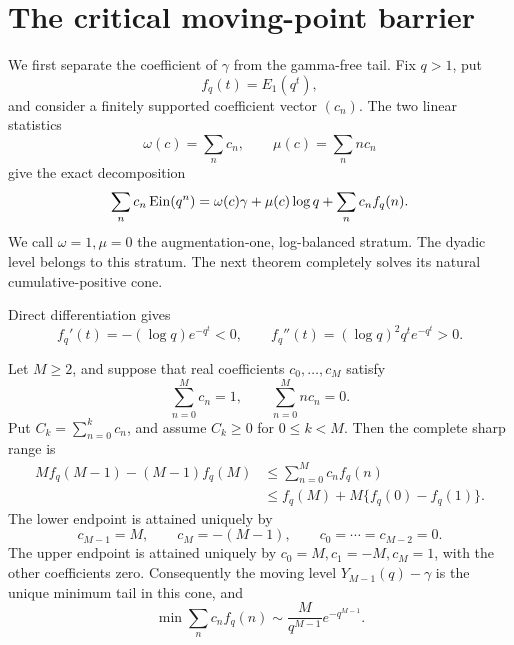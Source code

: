 \section{The critical moving-point barrier}
\label{sec:barrier}

We first separate the coefficient of \(\gamma\) from the gamma-free tail.
Fix \(q>1\), put
\[
 f_q(t)=E_1(q^t),
\]
and consider a finitely supported coefficient vector \((c_n)\).  The two
linear statistics
\[
 \omega(c)=\sum_nc_n,
 \qquad
 \mu(c)=\sum_nnc_n
\]
give the exact decomposition
\begin{equation}\label{eq:augmentation-decomposition}
 \sum_nc_n\operatorname{Ein}(q^n)
 =\omega(c)\gamma+\mu(c)\log q+\sum_nc_nf_q(n).
\end{equation}
We call \(\omega=1,\mu=0\) the augmentation-one, log-balanced stratum.
The dyadic level belongs to this stratum.  The next theorem completely solves
its natural cumulative-positive cone.

Direct differentiation gives
\begin{equation}\label{eq:fq-convex}
 f_q'(t)=-(\log q)e^{-q^t}<0,
 \qquad
 f_q''(t)=(\log q)^2q^te^{-q^t}>0.
\end{equation}

\begin{theorem}
\label{thm:augmentation-extremality}
Let \(M\ge2\), and suppose that real coefficients \(c_0,\ldots,c_M\)
satisfy
\[
 \sum_{n=0}^Mc_n=1,
 \qquad
 \sum_{n=0}^Mnc_n=0.
\]
Put \(C_k=\sum_{n=0}^kc_n\), and assume \(C_k\ge0\) for \(0\le k<M\).
Then the complete sharp range is
\begin{equation}\label{eq:augmentation-range}
 \begin{split}
 M f_q(M-1)-(M-1)f_q(M)
 &\le \sum_{n=0}^Mc_nf_q(n)\\
 &\le f_q(M)+M\{f_q(0)-f_q(1)\}.
 \end{split}
\end{equation}
The lower endpoint is attained uniquely by
\begin{equation}\label{eq:augmentation-minimizer}
 c_{M-1}=M,\qquad c_M=-(M-1),
 \qquad c_0=\cdots=c_{M-2}=0.
\end{equation}
The upper endpoint is attained uniquely by
\(c_0=M,c_1=-M,c_M=1\), with the other coefficients zero.
Consequently the moving level \(Y_{M-1}(q)-\gamma\) is the unique minimum
tail in this cone, and
\[
 \min\sum_nc_nf_q(n)
 \sim \frac{M}{q^{M-1}}e^{-q^{M-1}}.
\]
\end{theorem}


